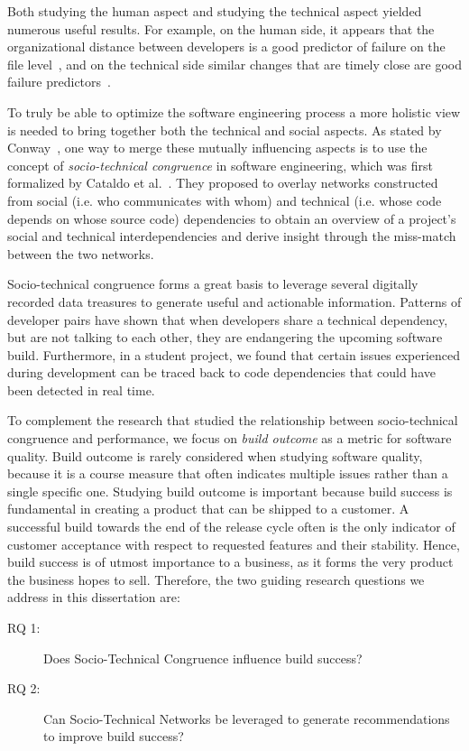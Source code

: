 Both studying the human aspect and studying the technical aspect yielded numerous useful results.
For example, on the human side, it appears that the organizational distance between developers is a good predictor of failure on the file level~\cite{nagappan:icse:2008}, and on the technical side similar changes that are timely close are good failure predictors~\cite{kim:icse:2007}.

To truly be able to optimize the software engineering process a more holistic view is needed to bring together both the technical and social aspects.
As stated by Conway~\cite{conway:datamination:1968}, one way to merge these mutually influencing aspects is to use the concept of \emph{socio-technical congruence} in software engineering, which was first formalized by Cataldo et al.~\cite{cataldo:cscw:2006}.
They proposed to overlay networks constructed from social (i.e. who communicates with whom) and technical (i.e. whose code depends on whose source code) dependencies to obtain an overview of a project's social and technical interdependencies and derive insight through the miss-match between the two networks.



Socio-technical congruence forms a great basis to leverage several digitally recorded data treasures to generate useful and actionable information.
Patterns of developer pairs have shown that when developers share a technical dependency, but are not talking to each other, they are endangering the upcoming software build.
Furthermore, in a student project, we found that certain issues experienced during development can be traced back to code dependencies that could have been detected in real time.

To complement the research that studied the relationship between socio-technical congruence and performance, we focus on \emph{build outcome} as a metric for software quality.
Build outcome is rarely considered when studying software quality, because it is a course measure that often indicates multiple issues rather than a single specific one.
Studying build outcome is important because build success is fundamental in creating a product that can be shipped to a customer.
A successful build towards the end of the release cycle often is the only indicator of customer acceptance with respect to requested features and their stability.
Hence, build success is of utmost importance to a business, as it forms the very product the business hopes to sell.
Therefore, the two guiding research questions we address in this dissertation are:
\begin{description}
\item[RQ 1:] Does Socio-Technical Congruence influence build success?
\item[RQ 2:] Can Socio-Technical Networks be leveraged to generate recommendations to improve build success?
\end{description}

